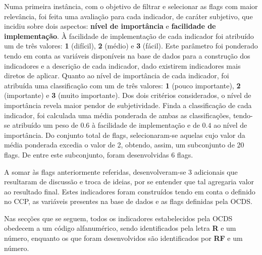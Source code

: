 Numa primeira instância, com o objetivo de filtrar e selecionar as flags com maior relevância, foi feita uma avaliação para cada indicador, de caráter subjetivo, que incidiu sobre dois aspectos: \textbf{nível de importância} e \textbf{facilidade de implementação}. À facilidade de implementação de cada indicador foi atribuído um de três valores: \textbf{1} (difícil), \textbf{2} (médio) e \textbf{3} (fácil). Este parâmetro foi ponderado tendo em conta as variáveis disponíveis na base de dados para a construção dos indicadores e a descrição de cada indicador, dado existirem  indicadores mais diretos de aplicar. Quanto ao nível de importância de cada indicador, foi atribuída uma classificação com um de três valores: \textbf{1} (pouco importante), \textbf{2} (importante) e \textbf{3} (muito importante). Dos dois critérios considerados, o nível de importância revela maior pendor de subjetividade. Finda a classificação de cada indicador, foi calculada uma média ponderada de ambas as classificações, tendo-se atribuído um peso de $0.6$ à facilidade de implementação e de $0.4$ ao nível de importância. Do conjunto total de flags, selecionaram-se aquelas cujo valor da média ponderada excedia o valor de 2, obtendo, assim, um subconjunto de 20 flags. De entre este subconjunto, foram desenvolvidas 6 flags.




A somar às flags anteriormente referidas, desenvolveram-se 3 adicionais que resultaram de discussão e troca de ideias, por se entender que tal agregaria valor ao resultado final. Estes indicadores foram construídos tendo em conta o definido no CCP, as variáveis presentes na base de dados e as flags definidas pela OCDS.


Nas secções que se seguem, todos os indicadores estabelecidos pela OCDS obedecem a um código alfanumérico, sendo identificados pela letra \textbf{R} e um número, enquanto os que foram desenvolvidos são identificados por \textbf{RF} e um número.

